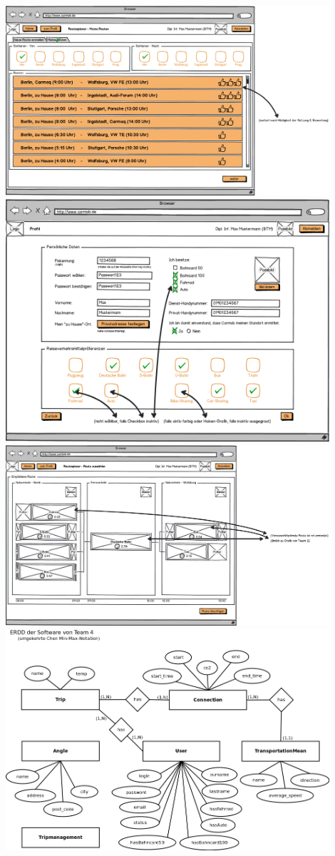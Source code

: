 \documentclass{article}
\begin{document}
\begin{center}
\includegraphics[width=12cm]{10_finaler_paperprototyp_005.png}\\
\includegraphics[width=12cm]{10_finaler_paperprototyp_006.png}\\
\includegraphics[width=12cm]{10_finaler_paperprototyp_007.png}\\
\includegraphics[width=12cm]{11_erdd.png}
\end{center}
\end{document}
